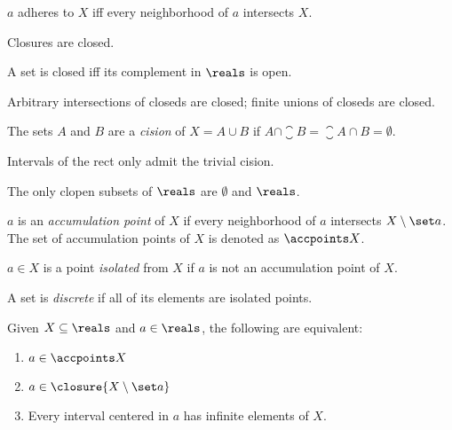 \begin{theorem}
	$a$ adheres to $X$ iff every neighborhood of $a$ intersects $X$.
\end{theorem}

\begin{corollary}
	Closures are closed.
\end{corollary}

\begin{theorem}
	A set is closed iff its complement in $\reals$ is open.
\end{theorem}

\begin{theorem}
	Arbitrary intersections of closeds are closed; finite unions of closeds are closed. 
\end{theorem}

\begin{definition}[Cision]
	The sets $A$ and $B$ are a \emph{cision} of $X = A \cup B$ if
	$A \cap \closure B = \closure A \cap B = \emptyset$.
\end{definition}

\begin{theorem}
	Intervals of the rect only admit the trivial cision.
\end{theorem}

\begin{corollary}
	The only clopen subsets of $\reals$ are $\emptyset$ and $\reals$.
\end{corollary}

\begin{definition}
	$a$ is an \emph{accumulation point} of $X$ if every neighborhood of $a$ intersects $X \setminus \set a$. The set of accumulation points of $X$ is denoted as $\accpoints X$.
\end{definition}

\begin{definition}
	$a \in X$ is a point \emph{isolated} from $X$ if $a$ is not an accumulation point of $X$.
\end{definition}

\begin{definition}
	A set is \emph{discrete} if all of its elements are isolated points.
\end{definition}

\begin{theorem}
	Given $X \subseteq \reals$ and $a \in \reals$, the following are equivalent:
	\begin{enumerate}
		\item $a \in \accpoints X$
		\item $a \in \closure{X \setminus \set a}$
		\item Every interval centered in $a$ has infinite elements of $X$.
	\end{enumerate}
\end{theorem}

